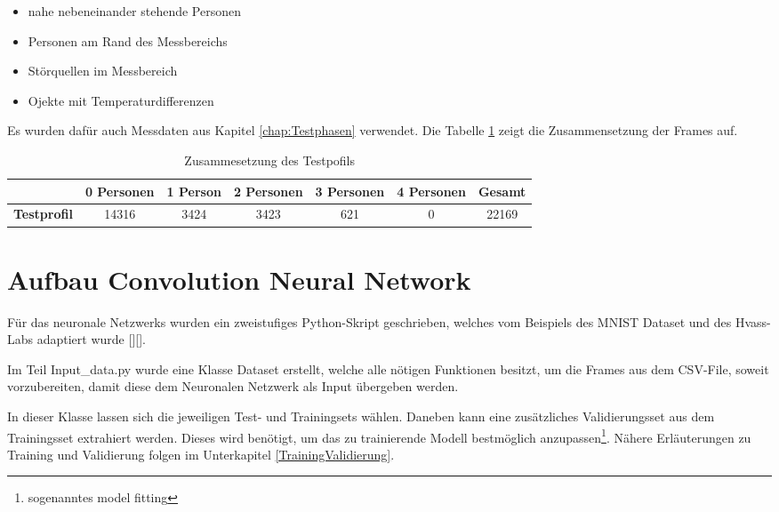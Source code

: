 \begin{itemize}
	\item nahe nebeneinander stehende Personen 
	\item Personen am Rand des Messbereichs
	\item Störquellen im Messbereich
	\item Ojekte mit Temperaturdifferenzen
\end{itemize}

Es wurden dafür auch Messdaten aus Kapitel \ref{chap:Testphasen} verwendet. Die Tabelle \ref{tab:Testprofil} zeigt die Zusammensetzung der Frames auf.

\begin{table}[H]
	\centering
	\caption{Zusammesetzung  des Testpofils}
	\label{tab:Testprofil}
	\begin{tabular}{|c|c|c|c|c|c|c|}
		\hline
		\rowcolor[HTML]{9B9B9B} 
		\multicolumn{1}{|l|}{\cellcolor[HTML]{9B9B9B}}                   & \multicolumn{1}{l|}{\cellcolor[HTML]{9B9B9B}\textbf{0 Personen}} & \textbf{1 Person} & \textbf{2 Personen} & \textbf{3 Personen} & \textbf{4 Personen} & \textbf{Gesamt} \\ \hline
		\cellcolor[HTML]{9B9B9B}\textbf{Testprofil}                         & 14316                                                          & 3424             & 3423               & 621               & 0               & 22169          \\ \hline
	\end{tabular}
\end{table}

\section{Aufbau Convolution Neural Network}
\label{AufbauConv}

Für das neuronale Netzwerks wurden ein zweistufiges Python-Skript geschrieben, welches vom Beispiels des \ac{MNIST Dataset} und des Hvass-Labs adaptiert wurde [\protect\cite{Tensorflow}][\protect\cite{HVASS}].

Im Teil Input\_data.py wurde eine Klasse Dataset erstellt, welche alle nötigen Funktionen besitzt, um die Frames aus dem \ac{CSV}-File, soweit vorzubereiten, damit diese dem Neuronalen Netzwerk als Input übergeben werden. 

In dieser Klasse lassen sich die jeweiligen Test- und Trainingsets wählen. Daneben kann eine zusätzliches Validierungsset aus dem Trainingsset extrahiert werden. Dieses wird benötigt, um das zu trainierende Modell bestmöglich anzupassen\footnote{sogenanntes model fitting}. Nähere Erläuterungen zu Training und Validierung folgen im Unterkapitel \ref{TrainingValidierung}.

